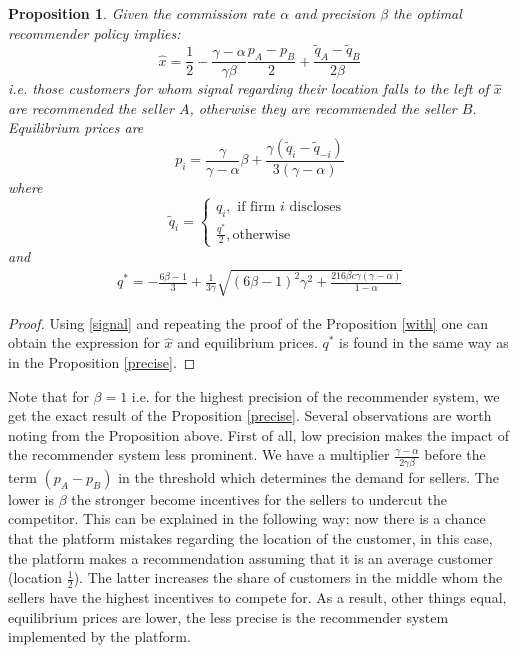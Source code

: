 \documentclass[a4paper]{article}
\newtheorem{proposition}[theorem]{Proposition}
\begin{document}
\begin{proposition}\label{notprecise}
	Given the commission rate $\alpha$ and precision $\beta$ the optimal recommender policy implies:
	$$\hat{x} = \frac{1}{2} - \frac{\gamma - \alpha}{\gamma \beta} \frac{p_A-p_B}{2} + \frac{\tilde{q}_A - \tilde{q}_B}{2 \beta}$$
	i.e. those customers for whom signal regarding their location falls to the left of $\hat{x}$ are recommended the seller $A$, otherwise they are recommended the seller $B$.
	Equilibrium prices are
	$$p_i = \frac{\gamma}{\gamma - \alpha} \beta + \frac{\gamma(\tilde{q}_i - \tilde{q}_{-i})}{3(\gamma - \alpha)}$$
	where
	$$\tilde{q}_i = \begin{cases}
	q_i, \text{ if firm }i\text{ discloses }\\
	\frac{q^*}{2}, \text{otherwise}
	\end{cases}$$
	and \begin{align}\label{thres_b}
	q^* = -\frac{6 \beta - 1}{3} + \frac{1}{3 \gamma} \sqrt{(6 \beta - 1)^2\gamma^2 + \frac{216 \beta c \gamma (\gamma - \alpha)}{1-\alpha}}
	\end{align}
\end{proposition}
\begin{proof}
	Using \eqref{signal} and repeating the proof of the Proposition \ref{with} one can obtain the expression for $\hat{x}$ and equilibrium prices. $q^*$ is found in the same way as in the Proposition \ref{precise}.
\end{proof}
Note that for $\beta = 1$ i.e. for the highest precision of the recommender system, we get the exact result of the Proposition \ref{precise}. Several observations are worth noting from the Proposition above. First of all, low precision makes the impact of the recommender system less prominent. We have a multiplier $\frac{\gamma - \alpha}{2 \gamma \beta}$ before the term $(p_A - p_B)$ in the threshold which determines the demand for sellers. The lower is $\beta$ the stronger become incentives for the sellers to undercut the competitor. This can be explained in the following way: now there is a chance that the platform mistakes regarding the location of the customer, in this case, the platform makes a recommendation assuming that it is an average customer (location $\frac{1}{2}$). The latter increases the share of customers in the middle whom the sellers have the highest incentives to compete for. As a result, other things equal, equilibrium prices are lower, the less precise is the recommender system implemented by the platform.
\end{document}
